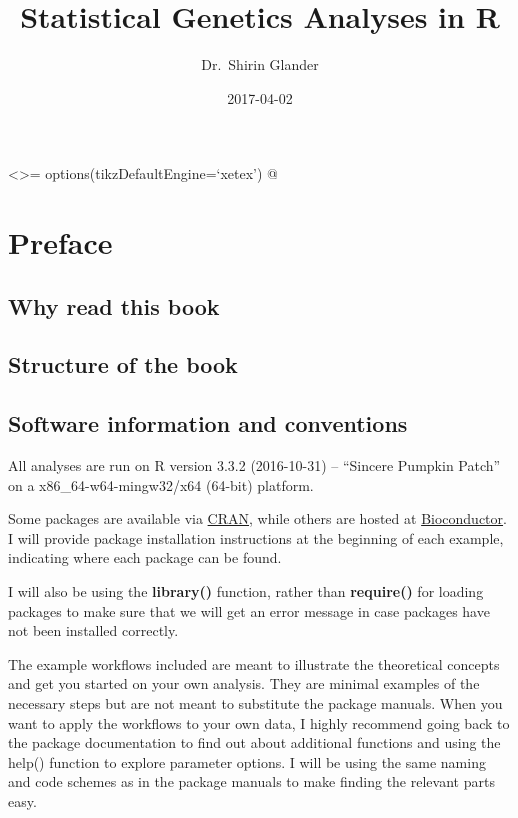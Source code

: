 \documentclass[12pt,]{book}
\title{Statistical Genetics Analyses in R}
\author{Dr.~Shirin Glander}
\date{2017-04-02}
\begin{document}
\maketitle

{
\hypersetup{linkcolor=black}
\setcounter{tocdepth}{1}
\tableofcontents
}
\listoftables
\listoffigures
\textless{}\textgreater{}= options(tikzDefaultEngine=`xetex') @

\chapter*{Preface}\label{preface}

\section*{Why read this book}\label{why-read-this-book}

\section*{Structure of the book}\label{structure-of-the-book}

\section*{Software information and
conventions}\label{software-information-and-conventions}

All analyses are run on R version 3.3.2 (2016-10-31) -- ``Sincere
Pumpkin Patch'' on a x86\_64-w64-mingw32/x64 (64-bit) platform.

Some packages are available via
\href{https://cran.r-project.org/}{CRAN}, while others are hosted at
\href{https://www.bioconductor.org/}{Bioconductor}. I will provide
package installation instructions at the beginning of each example,
indicating where each package can be found.

I will also be using the \textbf{library()} function, rather than
\textbf{require()} for loading packages to make sure that we will get an
error message in case packages have not been installed correctly.

The example workflows included are meant to illustrate the theoretical
concepts and get you started on your own analysis. They are minimal
examples of the necessary steps but are not meant to substitute the
package manuals. When you want to apply the workflows to your own data,
I highly recommend going back to the package documentation to find out
about additional functions and using the help() function to explore
parameter options. I will be using the same naming and code schemes as
in the package manuals to make finding the relevant parts easy.
\end{document}
